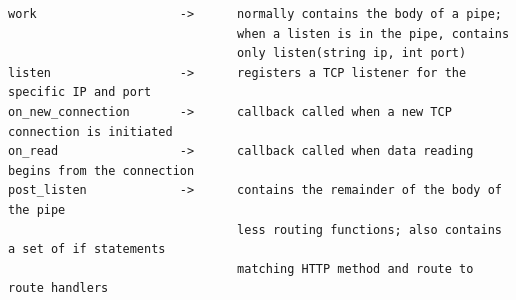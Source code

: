 \documentclass[./Report_main.tex]{subfiles}
\begin{document}
\begin{verbatim}
work                    ->      normally contains the body of a pipe;
                                when a listen is in the pipe, contains 
                                only listen(string ip, int port)
listen                  ->      registers a TCP listener for the specific IP and port
on_new_connection       ->      callback called when a new TCP connection is initiated
on_read                 ->      callback called when data reading begins from the connection
post_listen             ->      contains the remainder of the body of the pipe 
                                less routing functions; also contains a set of if statements 
                                matching HTTP method and route to route handlers
\end{verbatim}

\end{document}
